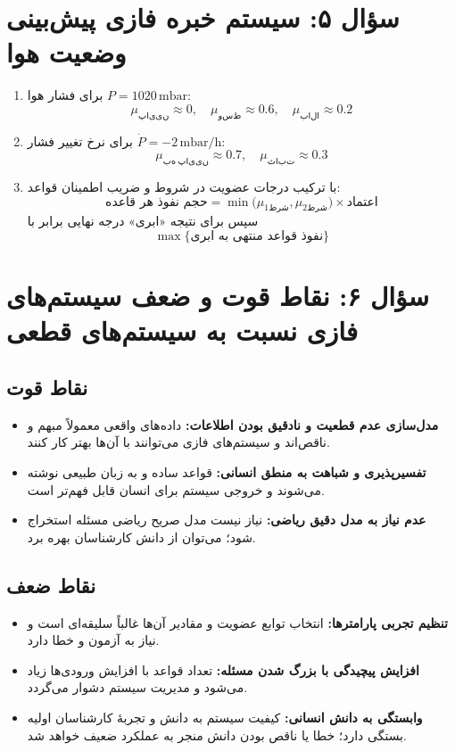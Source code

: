 \documentclass[12pt,a4paper]{article}
\begin{document}
	\section*{سؤال ۵: سیستم خبره فازی پیش‌بینی وضعیت هوا}
	\begin{enumerate}[label=\alph*)]
		\item برای فشار هوا \(P=1020\,\mathrm{mbar}\):
		\[
		\mu_{\mathrm{پایین}}\approx0,\quad
		\mu_{\mathrm{وسط}}\approx0.6,\quad
		\mu_{\mathrm{بالا}}\approx0.2
		\]
		\item برای نرخ تغییر فشار \(\dot P=-2\,\mathrm{mbar/h}\):
		\[
		\mu_{\mathrm{به\ پایین}}\approx0.7,\quad
		\mu_{\mathrm{ثابت}}\approx0.3
		\]
		\item با ترکیب درجات عضویت در شروط و ضریب اطمینان قواعد:
		\[
		\text{حجم نفوذ هر قاعده} = \min\bigl(\mu_{\text{شرط1}},\mu_{\text{شرط2}}\bigr)\times\text{اعتماد}
		\]
		سپس برای نتیجه «ابری» درجه نهایی برابر با
		\[
		\max\{\text{نفوذ قواعد منتهی به ابری}\}
		\]
	\end{enumerate}
	
	\section*{سؤال ۶: نقاط قوت و ضعف سیستم‌های فازی نسبت به سیستم‌های قطعی}
	\subsection*{نقاط قوت}
	\begin{itemize}
		\item \textbf{مدل‌سازی عدم قطعیت و نادقیق بودن اطلاعات:} داده‌های واقعی معمولاً مبهم و ناقص‌اند و سیستم‌های فازی می‌توانند با آن‌ها بهتر کار کنند.
		\item \textbf{تفسیرپذیری و شباهت به منطق انسانی:} قواعد ساده و به زبان طبیعی نوشته می‌شوند و خروجی سیستم برای انسان قابل فهم‌تر است.
		\item \textbf{عدم نیاز به مدل دقیق ریاضی:} نیاز نیست مدل صریح ریاضی مسئله استخراج شود؛ می‌توان از دانش کارشناسان بهره برد.
	\end{itemize}
	
	\subsection*{نقاط ضعف}
	\begin{itemize}
		\item \textbf{تنظیم تجربی پارامترها:} انتخاب توابع عضویت و مقادیر آن‌ها غالباً سلیقه‌ای است و نیاز به آزمون و خطا دارد.
		\item \textbf{افزایش پیچیدگی با بزرگ شدن مسئله:} تعداد قواعد با افزایش ورودی‌ها زیاد می‌شود و مدیریت سیستم دشوار می‌گردد.
		\item \textbf{وابستگی به دانش انسانی:} کیفیت سیستم به دانش و تجربهٔ کارشناسان اولیه بستگی دارد؛ خطا یا ناقص بودن دانش منجر به عملکرد ضعیف خواهد شد.
	\end{itemize}
	
\end{document}
